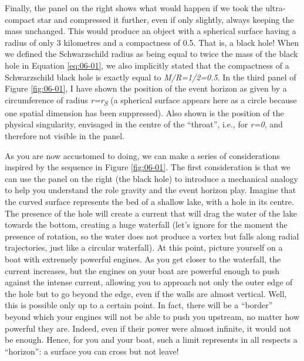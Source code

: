Finally, the panel on the right shows what would happen if we took the ultra-compact
star and compressed it further, even if only slightly, always keeping
the mass unchanged. This would produce an object with a spherical surface having a
radius of only 3 kilometres and a compactness of 0.5. That is, a black hole! When we
defined the Schwarzschild radius as being equal to twice the mass of the black hole in
Equation \eqref{eq:06-01}, we also implicitly stated that the compactness of a Schwarzschild black
hole is exactly equal to \emph{M/R=1/2=0.5}. In the third panel of
Figure \ref{fig:06-01}, I have shown the position of the event horizon as given by a circumference
of radius \emph{r=r\textsubscript{S}} (a spherical surface appears here as a circle
because one spatial dimension has been suppressed). Also shown is the position of the
physical singularity, envisaged in the centre of the
``throat'', i.e., for \emph{r=0}, and therefore not visible in the
panel.

As you are now accustomed to doing, we can make a series of considerations inspired by
the sequence in Figure \ref{fig:06-01}. The first consideration is that we can use the panel on the
right (the black hole) to introduce a mechanical analogy to help you understand the role
gravity and the event horizon play. Imagine that the curved surface represents the bed
of a shallow lake, with a hole in its centre. The presence of the hole will create a
current that will drag the water of the lake towards the bottom, creating a huge
waterfall (let's ignore for the moment the presence of rotation, so the water does not
produce a vortex but falls along radial trajectories, just like a circular waterfall).
At this point, picture yourself on a boat with extremely powerful engines. As you get
closer to the waterfall, the current increases, but the engines on your boat are
powerful enough to push against the intense current, allowing you to approach not only
the outer edge of the hole but to go beyond the edge, even if the walls are almost
vertical. Well, this is possible only up to a certain point. In fact, there will be a
``border'' beyond which your engines will not be able to push you upstream, no matter
how powerful they are. Indeed, even if their power were almost infinite, it would not be
enough. Hence, for you and your boat, such a limit represents in all respects a
``horizon'': a surface you can cross but not leave!

